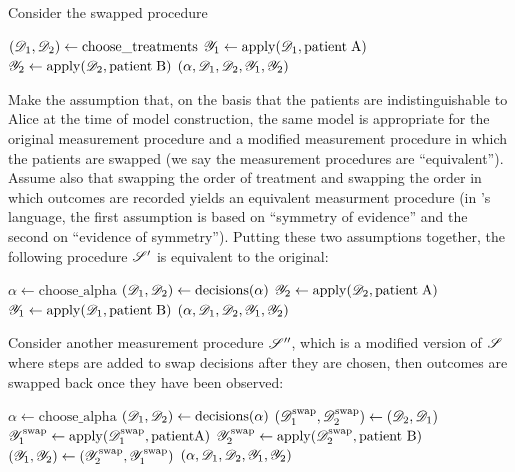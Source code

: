 Consider the swapped procedure

\begin{algorithmic}
    \State $(\mathscr{D}_1,\mathscr{D}_2) \gets \mathrm{choose\_treatments}$
    \State $\mathscr{Y}_1\gets \mathrm{apply}(\mathscr{D}_1,\mathrm{patient\;A})$
    \State $\mathscr{Y}_2\gets \mathrm{apply}(\mathscr{D}_2,\mathrm{patient\;B})$
    \State \Return $(\alpha,\mathscr{D}_1,\mathscr{D}_2,\mathscr{Y}_1,\mathscr{Y}_2)$
    \EndProcedure
\end{algorithmic}


Make the assumption that, on the basis that the patients are indistinguishable to Alice at the time of model construction, the same model is appropriate for the original measurement procedure and a modified measurement procedure in which the patients are swapped (we say the measurement procedures are ``equivalent''). Assume also that swapping the order of treatment and swapping the order in which outcomes are recorded yields an equivalent measurment procedure (in \citet{walley_statistical_1991}'s language, the first assumption is based on ``symmetry of evidence'' and the second on ``evidence of symmetry''). Putting these two assumptions together, the following procedure $\mathscr{S}'$ is equivalent to the original:

\begin{algorithmic}
    \State $\alpha \gets \mathrm{choose\_alpha}$
    \State $(\mathscr{D}_1,\mathscr{D}_2) \gets \mathrm{decisions}(\alpha)$
    \State $\mathscr{Y}_2\gets \mathrm{apply}(\mathscr{D}_2,\mathrm{patient\;A})$
    \State $\mathscr{Y}_1\gets \mathrm{apply}(\mathscr{D}_1,\mathrm{patient\;B})$
    \State \Return $(\alpha,\mathscr{D}_1,\mathscr{D}_2,\mathscr{Y}_1,\mathscr{Y}_2)$
    \EndProcedure
\end{algorithmic}

Consider another measurement procedure $\mathscr{S}''$, which is a modified version of $\mathscr{S}$ where steps are added to swap decisions after they are chosen, then outcomes are swapped back once they have been observed:

\begin{algorithmic}
    \State $\alpha \gets \mathrm{choose\_alpha}$
    \State $(\mathscr{D}_1,\mathscr{D}_2) \gets \mathrm{decisions}(\alpha)$
    \State $(\mathscr{D}_1^{\mathrm{swap}},\mathscr{D}_2^{\mathrm{swap}}) \gets (\mathscr{D}_2,\mathscr{D}_1)$
    \State $\mathscr{Y}^{\mathrm{swap}}_1\gets \mathrm{apply}(\mathscr{D}_1^{\mathrm{swap}},\mathrm{patient A})$
    \State $\mathscr{Y}_2^{\mathrm{swap}}\gets \mathrm{apply}(\mathscr{D}_2^{\text{swap}},\text{patient B})$
    \State $(\mathscr{Y}_1,\mathscr{Y}_2)\gets (\mathscr{Y}^{\mathrm{swap}}_2,\mathscr{Y}^{\mathrm{swap}}_1)$
    \State \Return $(\alpha,\mathscr{D}_1,\mathscr{D}_2,\mathscr{Y}_1,\mathscr{Y}_2)$
    \EndProcedure
\end{algorithmic}

